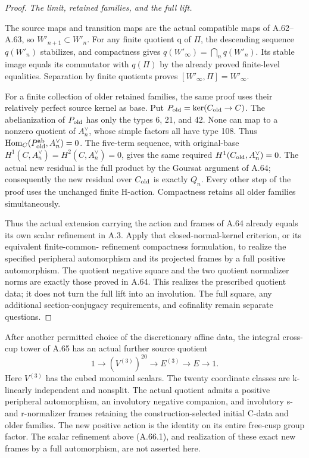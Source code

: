 \begin{proof}
\emph{The limit, retained families, and the full lift.}\par
The source maps and transition maps are the actual compatible maps
of A.62--A.63, so \(W'_{n+1}\subset W'_n\). For any finite quotient
q of \(\Pi\), the descending sequence \(q(W'_n)\) stabilizes, and
compactness gives
\(q(W'_\infty)=\bigcap_nq(W'_n)\). Its stable image equals its
commutator with \(q(\Pi)\) by the already proved finite-level
equalities. Separation by finite quotients proves
\([W'_\infty,\Pi]=W'_\infty\).

For a finite collection of older retained families, the same proof
uses their relatively perfect source kernel as base. Put
\(P_{\rm old}=\ker(C_{\rm old}\to C)\). The abelianization of
\(P_{\rm old}\) has only the types 6, 21, and 42. None can
map to a nonzero quotient of \(A_n^\vee\), whose simple factors
all have type 108. Thus
\(\operatorname{Hom}_C(P_{\rm old}^{\rm ab},A_n^\vee)=0\).
The five-term sequence, with original-base
\(H^1(C,A_n^\vee)=H^2(C,A_n^\vee)=0\), gives the same required
\(H^1(C_{\rm old},A_n^\vee)=0\). The actual new residual is the
full product by the Goursat argument of A.64; consequently the new
residual over \(C_{\rm old}\) is exactly \(Q_n\). Every other step of
the proof uses the unchanged finite H-action. Compactness retains
all older families simultaneously.

Thus the actual extension carrying the action and frames of A.64
already equals its own scalar refinement in A.3. Apply that
closed-normal-kernel criterion, or its equivalent finite-common-
refinement compactness formulation, to realize the specified
peripheral automorphism and its projected frames by a full positive
automorphism. The quotient negative square and the two quotient
normalizer norms are exactly those proved in A.64. This realizes
the prescribed quotient data; it does not turn the full lift into
an involution. The full square, any additional section-conjugacy
requirements, and cofinality remain separate questions.
\end{proof}


After another permitted choice of the discretionary affine data, the
integral cross-cup tower of A.65 has an actual further source quotient
\[
 1\longrightarrow (V^{(3)})^{20}\longrightarrow E^{(3)}
 \longrightarrow E\longrightarrow1.
 \tag{A.66.1}
\]
Here \(V^{(3)}\) has the cubed monomial scalars. The twenty coordinate
classes are k-linearly independent and nonsplit. The actual quotient
admits a positive peripheral automorphism, an involutory negative
companion, and involutory s- and r-normalizer frames retaining the
construction-selected initial C-data and older families. The new
positive action is the identity on its entire free-cusp group factor.
The scalar refinement above (A.66.1), and realization of these exact
new frames by a full automorphism, are not asserted here.

